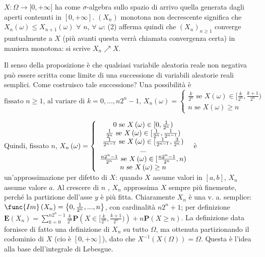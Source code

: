 \documentclass{article}
\begin{document}
$X:\Omega \rightarrow \lbrack 0,+\infty ]$ ha come $\sigma $-algebra sullo
spazio di arrivo quella generata dagli aperti contenuti in $[0,+\infty ]$. $%
\left( X_{n}\right) $ monotona non decrescente significa che $X_{n}\left(
\omega \right) \leq X_{n+1}\left( \omega \right) $ $\forall $ $n$, $\forall $
$\omega $: (2) afferma quindi che $\left( X_{n}\right) _{n\geq 1}$ converge
puntualmente a $X$ (pi\`{u} avanti questa verr\`{a} chiamata convergenza
certa) in maniera monotona: si scrive $X_{n}\nearrow X$.

Il senso della proposizione \`{e} che qualsiasi variabile aleatoria reale
non negativa pu\`{o} essere scritta come limite di una successione di
variabili aleatorie reali semplici. Come costruisco tale successione? Una
possibilit\`{a} \`{e}%
\begin{equation*}
\text{fissato }n\geq 1\text{, al variare di }k=0,...,n2^{n}-1\text{, }%
X_{n}\left( \omega \right) =\left\{ 
\begin{array}{c}
\frac{k}{2^{n}}\text{ se }X\left( \omega \right) \in \lbrack \frac{k}{2^{n}},%
\frac{k+1}{2^{n}}) \\ 
n\text{ se }X\left( \omega \right) \geq n%
\end{array}%
\right.
\end{equation*}

Quindi, fissato $n$, $X_{n}\left( \omega \right) =\left\{ 
\begin{array}{c}
0\text{ se }X\left( \omega \right) \in \lbrack 0,\frac{1}{2^{n}}) \\ 
\frac{1}{2^{n}}\text{ se }X\left( \omega \right) \in \lbrack \frac{1}{2^{n}},%
\frac{1}{2^{n-1}}) \\ 
\frac{1}{2^{n-1}}\text{ se }X\left( \omega \right) \in \lbrack \frac{1}{%
2^{n-1}},\frac{3}{2^{n}}) \\ 
... \\ 
\frac{n2^{n}-1}{2^{n}}\text{ se }X\left( \omega \right) \in \lbrack \frac{%
n2^{n}-1}{2^{n}},n) \\ 
n\text{ se }X\left( \omega \right) \geq n%
\end{array}%
\right. $ \`{e} un'approssimazione per difetto di $X$: quando $X$ assume
valori in $\left[ a,b\right] $, $X_{n}$ assume valore $a$. Al crescere di $n$%
, $X_{n}$ approssima $X$ sempre pi\`{u} finemente, perch\'{e} la partizione
dell'asse $y$ \`{e} pi\`{u} fitta. Chiaramente $X_{n}$ \`{e} una v. a.
semplice: $\func{Im}\left( X_{n}\right) =\left\{ 0,\frac{1}{2^{n}}%
,...,n\right\} $, con cardinalit\`{a} $n2^{n}+1$; per definizione $\mathbf{E}%
\left( X_{n}\right) =\sum_{k=0}^{n2^{n}-1}\frac{k}{2^{n}}\mathbf{P}\left(
X\in \lbrack \frac{k}{2^{n}},\frac{k+1}{2^{n}})\right) +n\mathbf{P}\left(
X\geq n\right) $. La definizione data fornisce di fatto una definizione di $%
X_{n}$ su tutto $\Omega $, ma ottenuta partizionando il codominio di $X$ (cio%
\`{e} $\left[ 0,+\infty \right] $), dato che $X^{-1}\left( X\left( \Omega
\right) \right) =\Omega $. Questa \`{e} l'idea alla base dell'integrale di
Lebesgue.
\end{document}
